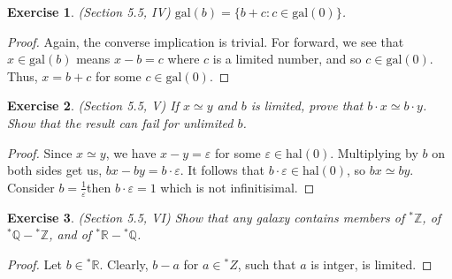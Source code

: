 \documentclass[a4paper, 11pt]{book}
\theoremstyle{plain}
\newtheorem{exercise}{Exercise}[chapter]
\theoremstyle{plain}
\newcommand{\Z}{\mathbb{Z}}
\newcommand{\Q}{\mathbb{Q}}
\newcommand{\R}{\mathbb{R}}
\newcommand{\ep}{\varepsilon}
\newcommand{\hyp}{{}^*}
\newcommand{\hal}{\text{hal}}
\newcommand{\gal}{\text{gal}}
\begin{document}
  \begin{exercise}
    (Section 5.5, IV)
    $\gal(b)=\{b+c: c\in \gal (0) \}$.
  \end{exercise}
  \begin{proof}
    Again, the converse implication is trivial. For forward, we see that $x \in \gal(b)$ means $x-b=c$ where $c$ is a limited number, and so $c \in \gal(0)$. Thus, $x=b+c$ for some $c \in \gal(0)$.
  \end{proof}
  
  \begin{exercise}
    (Section 5.5, V)
    If $x \simeq y$ and $b$ is limited, prove that $b \cdot x \simeq b \cdot y$. Show that the result can fail for unlimited $b$. 
  \end{exercise}
  \begin{proof}
    Since $x \simeq y$, we have $x-y=\ep$ for some $\ep \in \hal(0)$. Multiplying by $b$ on both sides get us, $bx-by=b \cdot \ep$. It follows that $b \cdot \ep \in \hal(0)$, so $bx \simeq by$. Consider $b=\frac{1}{\ep}$then $b \cdot \ep=1$ which is not infinitisimal.
  \end{proof}

  \begin{exercise}
    (Section 5.5, VI)
    Show that any galaxy contains members of $\hyp \Z$, of $\hyp \Q - \hyp \Z$, and of $\hyp \R - \hyp \Q$.
  \end{exercise}
  \begin{proof}
    Let $b \in \hyp \R$. Clearly, $b-a$ for $a \in \hyp Z$, such that $a$ is intger, is limited. 
  \end{proof}
\end{document}
